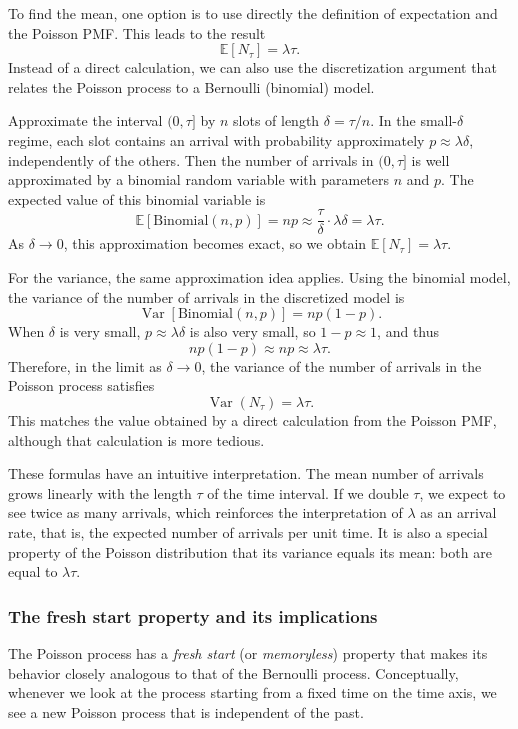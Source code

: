 To find the mean, one option is to use directly the definition of expectation and the Poisson PMF.  
This leads to the result
\[
\mathbb{E}[N_\tau] = \lambda \tau.
\]
Instead of a direct calculation, we can also use the discretization argument that relates the Poisson process to a Bernoulli (binomial) model.  

Approximate the interval \((0,\tau]\) by \(n\) slots of length \(\delta = \tau/n\).  
In the small-\(\delta\) regime, each slot contains an arrival with probability approximately \(p \approx \lambda \delta\), independently of the others.  
Then the number of arrivals in \((0,\tau]\) is well approximated by a binomial random variable with parameters \(n\) and \(p\).  
The expected value of this binomial variable is
\[
\mathbb{E}[\text{Binomial}(n,p)] = np \approx \frac{\tau}{\delta} \cdot \lambda \delta = \lambda \tau.
\]
As \(\delta \to 0\), this approximation becomes exact, so we obtain \(\mathbb{E}[N_\tau] = \lambda \tau\).  

For the variance, the same approximation idea applies.  
Using the binomial model, the variance of the number of arrivals in the discretized model is
\[
\operatorname{Var}[\text{Binomial}(n,p)] = np(1-p).
\]
When \(\delta\) is very small, \(p \approx \lambda \delta\) is also very small, so \(1 - p \approx 1\), and thus
\[
np(1-p) \approx np \approx \lambda \tau.
\]
Therefore, in the limit as \(\delta \to 0\), the variance of the number of arrivals in the Poisson process satisfies
\[
\operatorname{Var}(N_\tau) = \lambda \tau.
\]
This matches the value obtained by a direct calculation from the Poisson PMF, although that calculation is more tedious.  

These formulas have an intuitive interpretation.  
The mean number of arrivals grows linearly with the length \(\tau\) of the time interval.  
If we double \(\tau\), we expect to see twice as many arrivals, which reinforces the interpretation of \(\lambda\) as an arrival rate, that is, the expected number of arrivals per unit time.  
It is also a special property of the Poisson distribution that its variance equals its mean: both are equal to \(\lambda \tau\).


\subsubsection{The fresh start property and its implications}

The Poisson process has a \textit{fresh start} (or \textit{memoryless}) property that makes its behavior closely analogous to that of the Bernoulli process.  
Conceptually, whenever we look at the process starting from a fixed time on the time axis, we see a new Poisson process that is independent of the past.  

